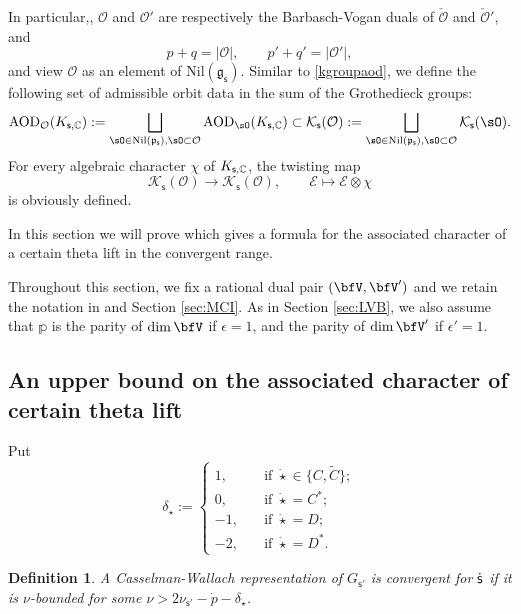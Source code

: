 \documentclass[12pt,a4paper]{amsart}
\def\abs#1{\left|{#1}\right|}
\newcommand{\CE}{{\mathcal {E}}}
\newcommand{\CK}{{\mathcal {K}}}
\newcommand{\CO}{{\mathcal {O}}}
\newcommand{\g}{\mathfrak g}
\newcommand{\p}{\mathfrak p}
\numberwithin{equation}{section}
\newtheorem{defn}[thm]{Definition}
\theoremstyle{remark}
\begin{document}
 In particular,,  $\CO$ and $\CO'$ are respectively the Barbasch-Vogan duals of $\check \CO$ and $\check \CO'$, and
\[
p+q=\abs{\CO}, \qquad p'+q'=\abs{\CO'},
\]
and view $\CO$ as an element of $\mathrm{Nil}(\g_\mathsf s)$. Similar to \eqref{kgroupaod}, we define the following set of admissible orbit data in the sum of the Grothedieck groups:
\[
  \mathrm{AOD}_{\CO}(K_{\mathsf s,\C}):=\bigsqcup_{\sO\in \mathrm{Nil}(\p_\mathsf s), \sO\subset \CO } \mathrm{AOD}_{\sO}(K_{\mathsf s,\C})\subset
  \CK_{\mathsf s}(\CO):=\bigsqcup_{\sO\in \mathrm{Nil}(\p_\mathsf s), \sO\subset \CO }\CK_{\mathsf s}(\sO).
\]
For every algebraic character $\chi$ of $K_{\mathsf s,\mathbb{C}}$, the twisting map
\[
\CK_{\mathsf s}(\CO)\rightarrow \CK_{\mathsf s}(\CO), \qquad \CE\mapsto \CE\otimes \chi
\]
is obviously defined.



In this section we will prove  which gives a formula for the
associated character of a certain theta lift in the convergent range.

Throughout this section, we fix a rational dual pair $(\bfV,\bfV')$ and
we retain the notation in  and Section \ref{sec:MCI}.
As in Section \ref{sec:LVB}, we also
assume that $\mathbb p$ is the parity of $\dim \bfV$ if $\epsilon=1$,
and  the parity of $\dim \bfV'$ if $\epsilon'=1$.

\subsection{An upper bound on the associated character of certain theta lift}


Put
\[
\delta_{\dot \star}:=\begin{cases}
1,& \quad\textrm{if $\dot \star\in \{C, \widetilde C\}$}; \\
0,& \quad\textrm{if $\dot \star=C^*$}; \\
-1,& \quad\textrm{if $\dot \star= D$};\\
-2,& \quad\textrm{if $\dot \star=D^*$}.
\end{cases}
\]

 \begin{defn}\label{defn:CRcov}
A Casselman-Wallach representation of $G_{\mathsf s'}$ is convergent for ${\dot{\mathsf s}}$ 
if it is $\nu$-bounded for some 
$\nu>
2\nu_{\mathsf s'}-\dot p-\delta_{\dot \star} $. 
\end{defn}
\end{document}
